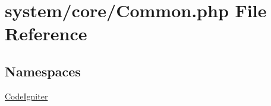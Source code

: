 \hypertarget{_common_8php}{\section{system/core/\-Common.php File Reference}
\label{_common_8php}
}
\subsection*{Namespaces}
\begin{DoxyCompactItemize}
\item 
\hyperlink{namespace_code_igniter}{Code\-Igniter}
\end{DoxyCompactItemize}
